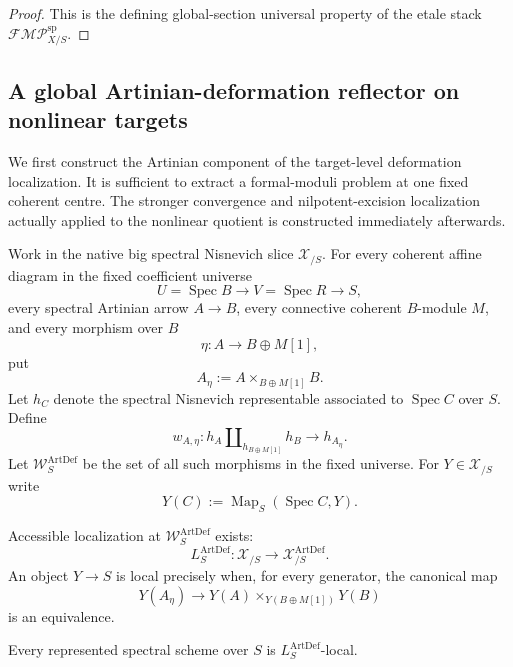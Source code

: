 \begin{proof}
This is the defining global-section universal property of the etale stack
$\mathscr{FMP}^{\mathrm{sp}}_{X/S}$.
\end{proof}

\subsection{A global Artinian-deformation reflector on nonlinear targets}

We first construct the Artinian component of the target-level deformation
localization.  It is sufficient to extract a formal-moduli problem at one
fixed coherent centre.  The stronger convergence and nilpotent-excision
localization actually applied to the nonlinear quotient is constructed
immediately afterwards.

\begin{definition}
\label{def:bnla-global-artdef-generators}
Work in the native big spectral Nisnevich slice $\mathcal X_{/S}$.  For every
coherent affine diagram in the fixed coefficient universe
\[
    U=\operatorname{Spec}B
    \longrightarrow
    V=\operatorname{Spec}R
    \longrightarrow S,
\]
every spectral Artinian arrow $A\to B$, every connective coherent
$B$-module $M$, and every morphism over $B$
\[
    \eta:A\longrightarrow B\oplus M[1],
\]
put
\[
    A_\eta:=A\times_{B\oplus M[1]}B.
\]
Let $h_C$ denote the spectral Nisnevich representable associated to
$\operatorname{Spec}C$ over $S$.  Define
\[
\boxed{
    w_{A,\eta}:
    h_A\amalg_{h_{B\oplus M[1]}}h_B
    \longrightarrow
    h_{A_\eta}.}
\]
Let $\mathcal W^{\mathrm{ArtDef}}_S$ be the set of all such morphisms in the
fixed universe.  For $Y\in\mathcal X_{/S}$ write
\[
    Y(C):=\operatorname{Map}_S(\operatorname{Spec}C,Y).
\]
\end{definition}

\begin{theorem}
\label{thm:bnla-global-artdef-reflector}
Accessible localization at
$\mathcal W^{\mathrm{ArtDef}}_S$ exists:
\[
\boxed{
    L^{\mathrm{ArtDef}}_S:
    \mathcal X_{/S}
    \longrightarrow
    \mathcal X^{\mathrm{ArtDef}}_{/S}.}
\]
An object $Y\to S$ is local precisely when, for every generator, the canonical
map
\[
\boxed{
    Y(A_\eta)
    \longrightarrow
    Y(A)\times_{Y(B\oplus M[1])}Y(B)}
\]
is an equivalence.

Every represented spectral scheme over $S$ is
$L^{\mathrm{ArtDef}}_S$-local.
\end{theorem}

